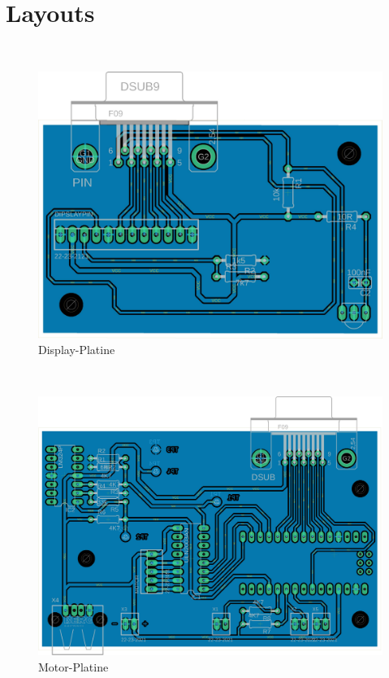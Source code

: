 \documentclass[11pt, titlepage]{report}
\begin{document}
		\section{Layouts}
			~
			~
			\begin{figure}[!htbp]
				\centering
				\includegraphics[height=0.9\linewidth ,angle=90]{./docs/Display_LayoutW.pdf}
				\caption{Display-Platine}
			\end{figure}
			\newpage
			~
			~
			~
			\begin{figure}[!htbp]
				\centering
				\includegraphics[height=0.9\linewidth ,angle=90]{./docs/Motor_LayoutW.pdf}
				\caption{Motor-Platine}
			\end{figure}
\end{document}
